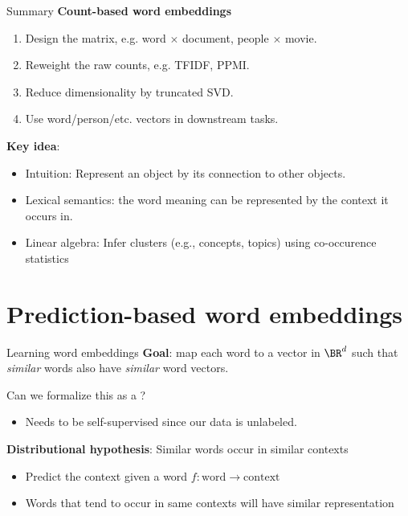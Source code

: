 \documentclass[usenames,dvipsnames,notes,11pt,aspectratio=169]{beamer}
\newcommand{\pdfnote}[1]{}
\begin{document}
\begin{frame}
    {Summary}
    \textbf{Count-based word embeddings}\\
    \begin{enumerate}
        \item Design the matrix, e.g. word $\times$ document, people $\times$ movie.
        \item Reweight the raw counts, e.g. TFIDF, PPMI.
        \item Reduce dimensionality by truncated SVD.
        \item Use word/person/etc. vectors in downstream tasks.
    \end{enumerate}
    
    \textbf{Key idea}:\\
    \begin{itemize}
        \item Intuition: Represent an object by its connection to other objects.
        \item Lexical semantics: the word meaning can be represented by the context it occurs in.
        \item Linear algebra: Infer clusters (e.g., concepts, topics) using co-occurence statistics
    \end{itemize}
\end{frame}

\section{Prediction-based word embeddings}

\begin{frame}
    {Learning word embeddings}
    \textbf{Goal}: map each word to a vector in $\BR^d$ such that \textit{similar} words also have \textit{similar} word vectors.
    \pdfnote{The two "similar" have different meanings!}
    \vspace{1em}
    \pause

    Can we formalize this as a ?\\
    \begin{itemize}
        \item Needs to be self-supervised since our data is unlabeled.
    \end{itemize}
    \pause

    \textbf{Distributional hypothesis}: Similar words occur in similar contexts\\
    \begin{itemize}
        \item Predict the context given a word $f\colon \text{word} \rightarrow \text{context}$
        \item Words that tend to occur in same contexts will have similar representation
    \end{itemize}
    \pdfnote{
        If we can successfully predict the context given a word, that means that words that occur in similar contexts have similar representations.
    }
\end{frame}
\end{document}
